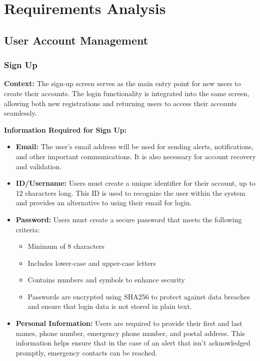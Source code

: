 \documentclass[conference]{IEEEtran}
\begin{document}
\section{Requirements Analysis}
\subsection{User Account Management}
\subsubsection{Sign Up}
\textbf{Context:} The sign-up screen serves as the main entry point for new users to create their accounts. The login functionality is integrated into the same screen, allowing both new registrations and returning users to access their accounts seamlessly.

\textbf{Information Required for Sign Up:}
\begin{itemize}
    \item \textbf{Email:} The user’s email address will be used for sending alerts, notifications, and other important communications. It is also necessary for account recovery and validation.
    \item \textbf{ID/Username:} Users must create a unique identifier for their account, up to 12 characters long. This ID is used to recognize the user within the system and provides an alternative to using their email for login.
    \item \textbf{Password:} Users must create a secure password that meets the following criteria:
    \begin{itemize}
        \item Minimum of 8 characters
        \item Includes lower-case and upper-case letters
        \item Contains numbers and symbols to enhance security
        \item Passwords are encrypted using SHA256 to protect against data breaches and ensure that login data is not stored in plain text.
    \end{itemize}
    \item \textbf{Personal Information:} Users are required to provide their first and last names, phone number, emergency phone number, and postal address. This information helps ensure that in the case of an alert that isn’t acknowledged promptly, emergency contacts can be reached.
\end{itemize}
\end{document}
